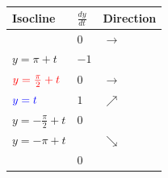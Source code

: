 \documentclass[convert]{standalone}
\begin{document}
    
\begin{tabular}{|p{1.25in}|p{0.25in}|p{0.55in}|}
	\hline
	Isocline                 & $\frac{dy}{dt}$ & Direction         \\ \hline
	& $0$             & $\longrightarrow$                  \\ \hline
	$y = \pi + t$            & $-1$           & 		           \\ \hline
	${\color{red}y = \frac{\pi}{2} + t}$  & $0$             & $\longrightarrow$ \\ \hline
	${\color{blue}y = t}$                  & $1$             & $\nearrow$        \\ \hline
	$y = -\frac{\pi}{2} + t$ & $0$             &                   \\ \hline
	$y = -\pi + t$ &            & $\searrow$        \\ \hline
	& $0$             &                   \\ \hline
\end{tabular}
\end{document}
